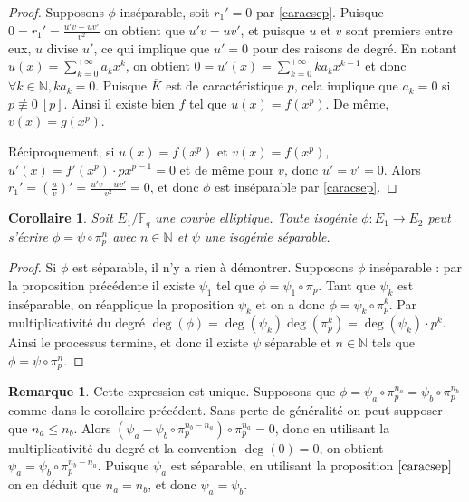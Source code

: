 \documentclass{article}
\theoremstyle{plain}%
\newtheorem{cor}[thm]{Corollaire}
\theoremstyle{definition}%
\newtheorem{rem}[thm]{Remarque}
\newcommand{\F}{\mathbb{F}}
\newcommand{\N}{\mathbb{N}}
\begin{document}
\begin{proof}
  Supposons $\phi$ inséparable, soit $r_1' = 0$ par \ref{caracsep}. Puisque $0 = r_1' = \frac{u'v -uv'}{v^2}$ on obtient que $u'v = uv'$, et puisque $u$ et $v$ sont premiers entre eux, $u$ divise $u'$, ce qui implique que $u' = 0$ pour des raisons de degré.  En notant $u(x) = \sum_{k=0}^{+\infty} a_kx^k$, on obtient $0 = u'(x) = \sum_{k=0}^{+\infty} ka_kx^{k-1}$ et donc $\forall k\in \N, ka_k = 0$. Puisque $\overline{K}$ est de caractéristique $p$, cela implique que $a_k = 0$ si $p\not\equiv 0\ [p]$. Ainsi il existe bien $f$ tel que $u(x) = f(x^p)$. De même, $v(x) = g(x^p)$. 

  Réciproquement, si $u(x) = f(x^p)$ et $v(x) = f(x^p)$, $u'(x) = f'(x^p)\cdot px^{p-1} = 0$ et de même pour $v$, donc $u' = v' = 0$. Alors $r_1' = (\frac{u}{v})' =  \frac{u'v -uv'}{v^2} = 0$, et donc $\phi$ est inséparable par \ref{caracsep}.
\end{proof}



\begin{cor}
  Soit $E_1/\F_q$ une courbe elliptique. Toute isogénie $\phi : E_1 \to E_2 $ peut s'écrire $\phi = \psi \circ \pi_p^n$ avec $n\in \N$ et $\psi$ une isogénie séparable.
\end{cor}

\begin{proof}
  Si $\phi$ est séparable, il n'y a rien à démontrer. Supposons $\phi$ inséparable : par la proposition précédente il existe $\psi_1$ tel que $\phi = \psi_1 \circ \pi_p$. Tant que $\psi_k$ est inséparable, on réapplique la proposition $\psi_k$ et on a donc $\phi = \psi_k \circ \pi_p^k$. 
  Par multiplicativité du degré $\deg(\phi) = \deg(\psi_k)\deg(\pi_p^k) = \deg(\psi_k)\cdot p^k$.
  Ainsi le processus termine, et donc il existe $\psi$ séparable et $n\in \N$ tels que $\phi = \psi \circ \pi_p^n$.
\end{proof}

\begin{rem}
  Cette expression est unique. Supposons que $\phi = \psi_a \circ \pi_p^{n_a} = \psi_b \circ \pi_p^{n_b}$ comme dans le corollaire précédent. Sans perte de généralité on peut supposer que $n_a \le n_b$. Alors $(\psi_a - \psi_b \circ \pi_p^{n_b - n_a}) \circ \pi_p^{n_a} = 0$, donc en utilisant la multiplicativité du degré et la convention $\deg(0) = 0$, on obtient $\psi_a = \psi_b \circ \pi_p^{n_b - n_a}$. Puisque $\psi_a$ est séparable, en utilisant la proposition $\ref{caracsep}$ on en déduit que $n_a = n_b$, et donc $\psi_a = \psi_b$.
\end{rem}
\end{document}
